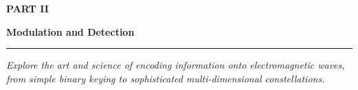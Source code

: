 
\cleardoublepage
\thispagestyle{empty}  %

\vspace*{40pt}  %

\begin{center}

{\sffamily\bfseries\fontsize{60}{68}\selectfont PART II}

\vspace{30pt}

{\sffamily\bfseries\fontsize{48}{56}\selectfont Modulation and Detection}

\vspace{20pt}

\rule{0.5\textwidth}{0.4pt}  %

\vspace{20pt}

{\itshape\large
Explore the art and science of encoding information onto electromagnetic waves,\\
from simple binary keying to sophisticated multi-dimensional constellations.
}

\end{center}

\vspace{80pt}  %

\clearpage
